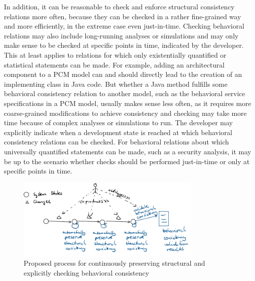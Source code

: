 In addition, it can be reasonable to check and enforce structural consistency relations more often, because they can be checked in a rather fine-grained way and more efficiently, in the extreme case even just-in-time.
Checking behavioral relations may also include long-running analyses or simulations and may only make sense to be checked at specific points in time, indicated by the developer.
This at least applies to relations for which only existentially quantified or statistical statements can be made.
For example, adding an architectural component to a \gls{PCM} model can and should directly lead to the creation of an implementing class in Java code. %
But whether a Java method fulfills some behavioral consistency relation to another model, such as the behavioral service specifications in a \gls{PCM} model, usually makes sense less often, as it requires more coarse-grained modifications to achieve consistency and checking may take more time because of complex analyses or simulations to run.
The developer may explicitly indicate when a development state is reached at which behavioral consistency relations can be checked.
For behavioral relations about which universally quantified statements can be made, such as a security analysis, it may be up to the scenario whether checks should be performed just-in-time or only at specific points in time.

\begin{figure}
    \centering
    \includegraphics[width=0.8\textwidth]{figures/prologue/networks/process_structure_behavior.png}
    \caption[Process for preserving structural and behavioral consistency]{Proposed process for continuously preserving structural and explicitly checking behavioral consistency}
    \label{fig:networks:process_structure_behavior}
\end{figure}

